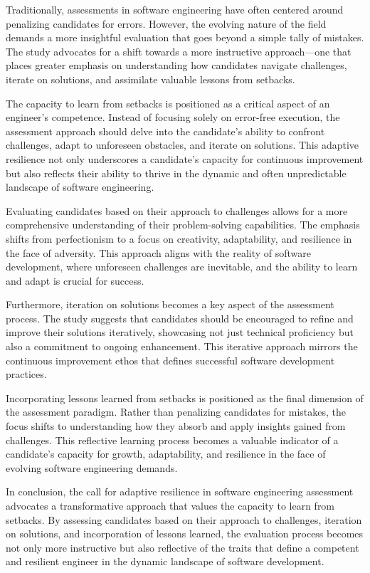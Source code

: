 \documentclass[
    a4paper, %
    10pt, %
    unnumberedsections, %
    twoside, %
]{LTJournalArticle}
\begin{document}
Traditionally, assessments in software engineering have often centered around penalizing candidates for errors. However, the evolving nature of the field demands a more insightful evaluation that goes beyond a simple tally of mistakes. The study advocates for a shift towards a more instructive approach—one that places greater emphasis on understanding how candidates navigate challenges, iterate on solutions, and assimilate valuable lessons from setbacks.

The capacity to learn from setbacks is positioned as a critical aspect of an engineer's competence. Instead of focusing solely on error-free execution, the assessment approach should delve into the candidate's ability to confront challenges, adapt to unforeseen obstacles, and iterate on solutions. This adaptive resilience not only underscores a candidate's capacity for continuous improvement but also reflects their ability to thrive in the dynamic and often unpredictable landscape of software engineering.

Evaluating candidates based on their approach to challenges allows for a more comprehensive understanding of their problem-solving capabilities. The emphasis shifts from perfectionism to a focus on creativity, adaptability, and resilience in the face of adversity. This approach aligns with the reality of software development, where unforeseen challenges are inevitable, and the ability to learn and adapt is crucial for success.

Furthermore, iteration on solutions becomes a key aspect of the assessment process. The study suggests that candidates should be encouraged to refine and improve their solutions iteratively, showcasing not just technical proficiency but also a commitment to ongoing enhancement. This iterative approach mirrors the continuous improvement ethos that defines successful software development practices.

Incorporating lessons learned from setbacks is positioned as the final dimension of the assessment paradigm. Rather than penalizing candidates for mistakes, the focus shifts to understanding how they absorb and apply insights gained from challenges. This reflective learning process becomes a valuable indicator of a candidate's capacity for growth, adaptability, and resilience in the face of evolving software engineering demands.

In conclusion, the call for adaptive resilience in software engineering assessment advocates a transformative approach that values the capacity to learn from setbacks. By assessing candidates based on their approach to challenges, iteration on solutions, and incorporation of lessons learned, the evaluation process becomes not only more instructive but also reflective of the traits that define a competent and resilient engineer in the dynamic landscape of software development.
\end{document}
